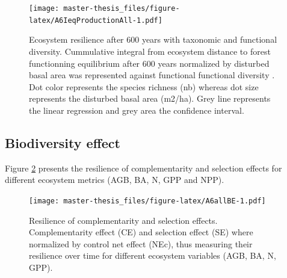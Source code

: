 \documentclass[12pt,]{article}
\theoremstyle{definition}
\theoremstyle{definition}
\theoremstyle{remark}
\begin{document}
\begin{figure}[htbp]
\centering
\texttt{[image: master-thesis\_files/figure-latex/A6IeqProductionAll-1.pdf]}
\caption{\label{fig:A6IeqProductionAll}Ecosystem resilience after 600 years
with taxonomic and functional diversity. Cummulative integral from
ecosystem distance to forest functionning equilibrium after 600 years
normalized by disturbed basal area was represented against functional
functional diversity \citep[FRIC, FEve, FDiv, and
FDis,][]{villeger_new_2008}. Dot color represents the species richness
(nb) whereas dot size represents the disturbed basal area (m2/ha). Grey
line represents the linear regression and grey area the confidence
interval.}
\end{figure}

\subsection{Biodiversity effect}\label{biodiversity-effect-3}

Figure \ref{fig:A6allBE} presents the resilience of complementarity and
selection effects for different ecosystem metrics (AGB, BA, N, GPP and
NPP).

\begin{figure}[htbp]
\centering
\texttt{[image: master-thesis\_files/figure-latex/A6allBE-1.pdf]}
\caption{\label{fig:A6allBE}Resilience of complementarity and selection
effects. Complementarity effect (CE) and selection effect (SE) where
normalized by control net effect (NEc), thus measuring their resilience
over time for different ecosystem variables (AGB, BA, N, GPP).}
\end{figure}


\listoftables
\listoffigures
\end{document}

